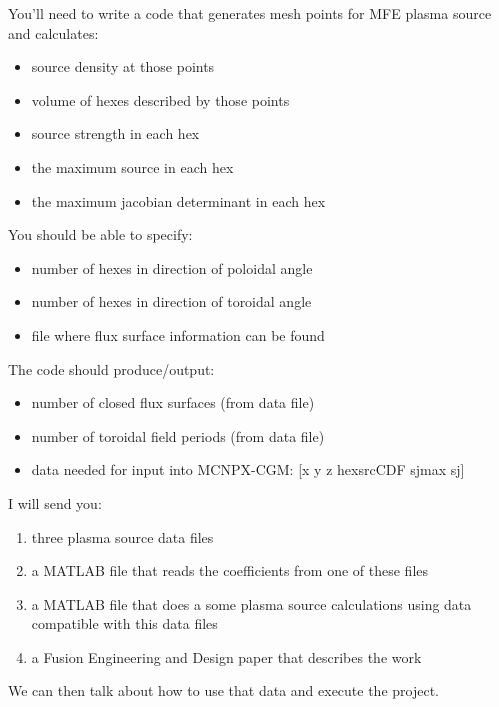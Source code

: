 \documentclass[12pt]{article}
\begin{document}
You'll need to write a code that generates mesh points for MFE plasma source and calculates:
\begin{itemize}
\item source density at those points
\item volume of hexes described by those points
\item source strength in each hex
\item the maximum source in each hex
\item the maximum jacobian determinant in each hex
\end{itemize}

You should be able to specify:
\begin{itemize}
\item number of hexes in direction of poloidal angle
\item number of hexes in direction of toroidal angle
\item file where flux surface information can be found
\end{itemize}

The code should produce/output:
\begin{itemize}
\item number of closed flux surfaces (from data file)
\item number of toroidal field periods (from data file)
\item data needed for input into MCNPX-CGM: [x y z hexsrcCDF sjmax sj]
\end{itemize}

I will send you:
\begin{enumerate}
\item three plasma source data files
\item a MATLAB file that reads the coefficients from one of these files
\item a MATLAB file that does a some plasma source calculations using data compatible with this data files
\item a Fusion Engineering and Design paper that describes the work
\end{enumerate}

We can then talk about how to use that data and execute the project.
\end{document}
